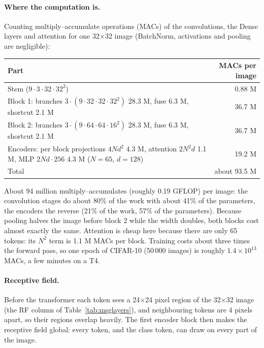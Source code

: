 \documentclass[11pt,a4paper]{article}
\begin{document}
\paragraph{Where the computation is.}
Counting multiply--accumulate operations (MACs) of the convolutions, the Dense layers and attention for one 32$\times$32 image (BatchNorm,
activations and pooling are negligible):
\begin{center}
\begin{tabularx}{\linewidth}{@{}Xr@{}}
\toprule
\textbf{Part} & \textbf{MACs per image}\\
\midrule
Stem ($9\cdot3\cdot32\cdot32^2$) & 0.88 M\\
Block 1: branches $3\cdot(9\cdot32\cdot32\cdot32^2)$ 28.3 M, fuse 6.3 M, shortcut 2.1 M & 36.7 M\\
Block 2: branches $3\cdot(9\cdot64\cdot64\cdot16^2)$ 28.3 M, fuse 6.3 M, shortcut 2.1 M & 36.7 M\\
Encoders: per block projections $4Nd^2$ 4.3 M, attention $2N^2d$ 1.1 M, MLP $2Nd\cdot256$ 4.3 M ($N=65$, $d=128$) & 19.2 M\\
\midrule
Total & about 93.5 M\\
\bottomrule
\end{tabularx}
\end{center}
About 94 million multiply--accumulates (roughly 0.19 GFLOP) per image: the convolution stages do about 80\% of the work with about 41\% of
the parameters, the encoders the reverse (21\% of the work, 57\% of the parameters). Because pooling halves the image before block 2 while
the width doubles, both blocks cost almost exactly the same. Attention is cheap here because there are only 65 tokens: its $N^2$ term is
1.1 M MACs per block. Training costs about three times the forward pass, so one epoch of CIFAR-10 (50\,000 images) is roughly
$1.4\times10^{13}$ MACs, a few minutes on a T4.

\paragraph{Receptive field.}
Before the transformer each token sees a 24$\times$24 pixel region of the 32$\times$32 image (the RF column of
Table~\ref{tab:msglayers}), and neighbouring tokens are 4 pixels apart, so their regions overlap heavily. The first encoder block then makes
the receptive field global: every token, and the class token, can draw on every part of the image.
\end{document}
